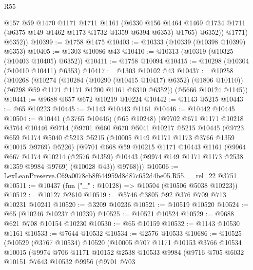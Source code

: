 \begin{lexlean}{R55}
\begin{coremodule}
              @157
              @59
              @1470
              @1171
              @1711
              @1161
              (@6330
                @156
                @1464
                @1469
                @1734
                @1711
                (@6375 @149 @1462 @1173 @1732 @1359 @6394 @6353)
                @1765)
              @6352))
          @1771)
        @6352))
@10399 := @1758 @1475
@10403 := @10333 (@10339 (@10398 @10399) @6353)
@10405 := @1303 @10086 @43
@10410 := @10313 (@10319 (@10325 (@10403 @10405) @6352))
@10411 := @1758 @10094
@10415 := @10298 (@10304 (@10410 @10411) @6353)
@10417 := @1303 @10102 @43
@10437 := @10258
    (@10268
      (@10274
        (@10284 (@10290 (@10415 @10417) @6352) (@1806 @10110))
        (@6298 @59 @1171 @1171 @1200 @1161 @6310 @6352))
      (@5666 @10124 @1145))
@10441 := @9688 @657 @672 @10219 @10224
@10442 := @1143 @5215
@10443 := @65 @10223
@10445 := @1143 @10443 @1161
@10446 := @10442 @10445
@10504 := @10441
    (@3765 @10446)
    (@65 @10248)
    (@9702
      @671
      @1171
      @10218
      @3764
      @10446
      @9714
      (@9701
        @660
        @670
        @5041
        @10217
        @5215
        @10445
        (@9723
          @659
          @1174
          @5040
          @5213
          @5215
          (@10005 @149 @1171 @1173 @3766 @1359 @10015 @9769)
          @5226)
        (@9701
          @668
          @59
          @10215
          @1171
          @10443
          @1161
          (@9964
            @667
            @1174
            @10214
            (@2576 @1359)
            @10443
            (@9974 @149 @1171 @1173 @2538 @1359 @9984 @9769)
            (@10028 @43))
          @9768)))
@10506 := LexLeanPreserve.C69a0078cb8f644959d8d87c652d4be05.R55.__rel_22 @3751
@10511 := @10437 (fun ("_" : @10128) => @10504 (@10506 @5038 @10223))
@10512 := @10127 @2610
@10519 := @5746 @3805 @92 @376 @709 @713 @10231 @10241
@10520 := @3209 @10236
@10521 := @10519 @10520
@10524 := @65 (@10246 @10237 @10239)
@10525 := @10521 @10524
@10529 := @9688 @621 @708 @10154 @10230
@10530 := @65 @10159
@10532 := @1143 @10530 @1161
@10533 := @7644 @10532
@10534 := @2576 @10533
@10686 := @10525
    (@10529
      (@3767 @10534)
      @10520
      (@10005
        @707
        @1171
        @10153
        @3766
        @10534
        @10015
        (@9974
          @706
          @1171
          @10152
          @2538
          @10533
          @9984
          (@9716
            @705
            @6032
            @10151
            @7643
            @10532
            @9956
            (@9701
              @703

\end{coremodule}
\end{lexlean}
